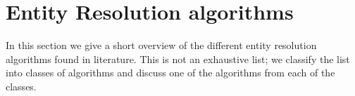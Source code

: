 
\section{Entity Resolution algorithms}


In this section we give a short overview of the different entity resolution algorithms found in literature.
This is not an exhaustive list; we classify the list into classes of algorithms and discuss one of the algorithms from each of the classes.





